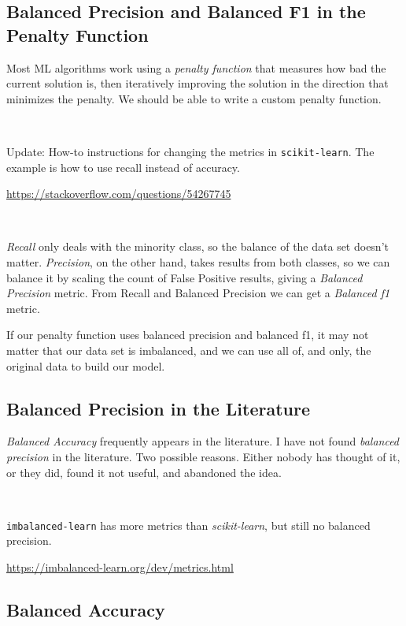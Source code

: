 \subsection{Balanced Precision and Balanced F1 in the Penalty Function}
\label{sec:Balanced_Metrics}


Most ML algorithms work using a {\it penalty function} that measures how bad the current solution is, then iteratively improving the solution in the direction that minimizes the penalty.  We should be able to write a custom penalty function.  

\

Update:  How-to instructions for changing the metrics in {\tt scikit-learn}.  The example is how to use recall instead of accuracy.  

\url{https://stackoverflow.com/questions/54267745}


\

{\it Recall} only deals with the minority class, so the balance of the data set doesn't matter.  {\it Precision}, on the other hand, takes results from both classes, so we can balance it by scaling the count of False Positive results, giving a {\it Balanced Precision} metric.  From Recall and Balanced Precision we can get a {\it Balanced f1} metric.  

If our penalty function uses balanced precision and balanced f1, it may not matter that our data set is imbalanced, and we can use all of, and only, the original data to build our model.  

\subsection{Balanced Precision in the Literature}

{\it Balanced Accuracy} frequently appears in the literature.  I have not found {\it balanced precision} in the literature.  Two possible reasons.  Either nobody has thought of it, or they did, found it not useful, and abandoned the idea.

\

{\tt imbalanced-learn} has more metrics than {\it scikit-learn}, but still no balanced precision.  

\url{https://imbalanced-learn.org/dev/metrics.html}



\subsection{Balanced Accuracy}

